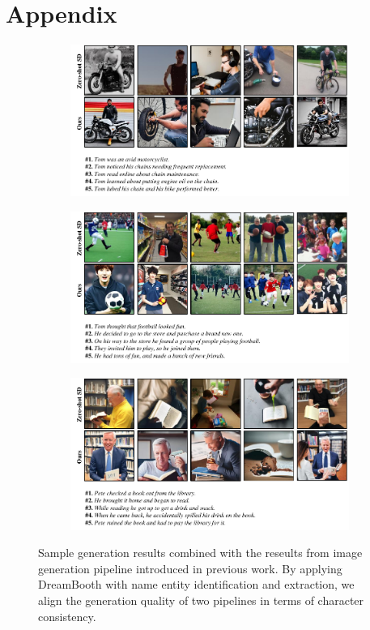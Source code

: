 \documentclass{article} %
\begin{document}
\section{Appendix}
\begin{figure}[!htbp]
\begin{center}
    \begin{subfigure}
        \centering
        \includegraphics[width=0.76\linewidth]{figure/3-example.pdf}
        \caption*{}
    \end{subfigure}
    
    \begin{subfigure}
        \centering
        \includegraphics[width=0.76\linewidth]{figure/4-example.pdf}
        \caption*{}
    \end{subfigure}
    
    \begin{subfigure}
        \centering
        \includegraphics[width=0.76\linewidth]{figure/5-example.pdf}
        \caption*{}
    \end{subfigure}
\end{center}
    \caption{Sample generation results combined with the reseults from image generation pipeline introduced in previous work. By applying DreamBooth with name entity identification and extraction, we align the generation quality of two pipelines in terms of character consistency.}
    \label{fig:plutchikLabel}
\end{figure}
\end{document}
